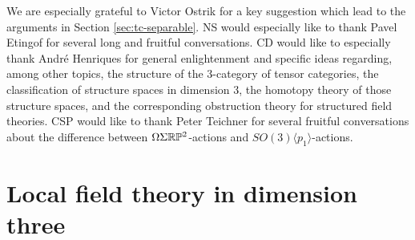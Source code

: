 \documentclass{amsart}
\begin{document}
We are especially grateful to Victor Ostrik for a key suggestion which lead to the arguments in Section \ref{sec:tc-separable}.  NS would especially like to thank Pavel Etingof for several long and fruitful conversations.  CD would like to especially thank Andr\'e Henriques for general enlightenment and specific ideas regarding, among other topics, the structure of the 3-category of tensor categories, the classification of structure spaces in dimension 3,  the homotopy theory of those structure spaces, and the corresponding obstruction theory for structured field theories.
CSP would like to thank Peter Teichner for several fruitful conversations about the difference between $\Omega \Sigma \mathbb R \mathbb P^2$-actions and $SO(3)\langle p_1 \rangle$-actions. 


\section{Local field theory in dimension three} \label{sec:lft}

\end{document}
